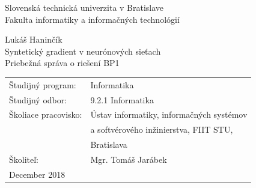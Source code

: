 \documentclass[12pt, twoside]{book}
\def\mfrok{2018}
\def\mfnazov{Syntetický gradient v neurónových sieťach}
\def\mftyp{Priebežná správa o riešení BP1}
\def\mfautor{Lukáš Haninčík}
\def\mfskolitel{Mgr. Tomáš Jarábek}
\def\mfkonzultant{tit. Meno Priezvisko, tit. }
\def\mfmiesto{Bratislava, \mfrok}
\def\mfodbor{9.2.1 Informatika}
\def\program{ Informatika }
\def\mfpracovisko{ Ústav informatiky, informačných systémov \\ 
& a softvérového inžinierstva, FIIT STU, \\
& Bratislava }
\begin{document}
     
\frontmatter

\thispagestyle{empty}
\noindent

\begin{center}
\large
Slovenská technická univerzita v Bratislave\\
Fakulta informatiky a informačných technológií

\vfill
Lukáš Haninčík \\
{\sc\LARGE\mfnazov}\\
\mftyp
\end{center}

\vfill

\noindent
\begin{tabular}{ll}
Študijný program: & \program \\
Študijný odbor: & \mfodbor \\
Školiace pracovisko: & \mfpracovisko \\
Školiteľ: & \mfskolitel \\
December 2018
\end{tabular}




\eject %




\end{document}
